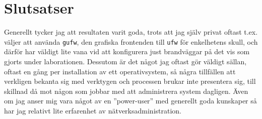 \section{Slutsatser}
Generellt tycker jag att resultaten varit goda, trots att jag själv privat
oftast t.ex. väljer att använda \texttt{gufw}, den grafiska frontenden till
\texttt{ufw} för enkelhetens skull, och därför har väldigt lite vana vid att
konfigurera just brandväggar på det vis som gjorts under laborationen. Dessutom
är det något jag oftast gör väldigt sällan, oftast en gång per installation av
ett operativsystem, så några tillfällen att verkligen bekanta sig med verktygen
och processen brukar inte presentera sig, till skillnad då mot någon som jobbar
med att administrera system dagligen. Även om jag anser mig vara något av en
''power-user'' med generellt goda kunskaper så har jag relativt lite erfarenhet
av nätverksadministration.
